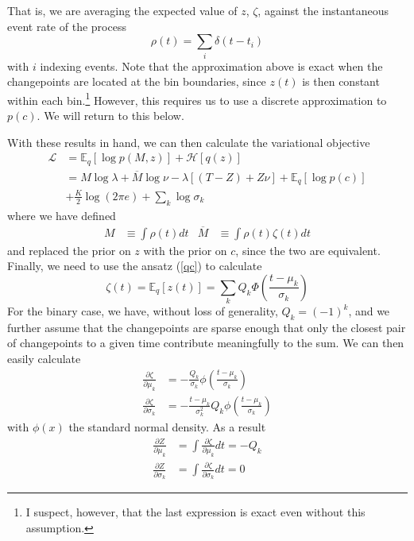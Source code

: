 \documentclass[11pt]{article}
\begin{document}
That is, we are averaging the expected value of $z$, $\zeta$, against the instantaneous event rate of the process
\begin{equation}
    \rho(t) = \sum_i \delta(t - t_i)
\end{equation}
with $i$ indexing events. Note that the approximation above is exact when the changepoints are located at the bin boundaries, since $z(t)$ is then constant within each bin.\footnote{I suspect, however, that the last expression is exact even without this assumption.} However, this requires us to use a discrete approximation to $p(c)$. We will return to this below.

With these results in hand, we can then calculate the variational objective
\begin{align}
    \mathcal{L} &= \mathbb{E}_q [\log p(M, z)] + \mathcal{H}[q(z)] \\
    &= M \log \lambda + \overline{M} \log \nu - \lambda [(T - Z) + Z\nu] + \mathbb{E}_q[\log p(c)] \\
    &+ \frac{K}{2}\log(2\pi e) + \sum_k \log \sigma_k
\end{align}
where we have defined
\begin{align}
    M &\equiv \int \rho(t) dt &
    \overline{M} &\equiv \int \rho(t) \zeta(t) dt
\end{align}
and replaced the prior on $z$ with the prior on $c$, since the two are equivalent. Finally, we need to use the ansatz (\ref{qc}) to calculate
\begin{equation}
    \zeta(t) = \mathbb{E}_q[z(t)] = \sum_k Q_k \Phi\left(\frac{t - \mu_k}{\sigma_k} \right)
\end{equation}
For the binary case, we have, without loss of generality, $Q_k = (-1)^k$, and we further assume that the changepoints are sparse enough that only the closest pair of changepoints to a given time contribute meaningfully to the sum. We can then easily calculate
\begin{align}
    \frac{\partial \zeta}{\partial \mu_k} &= -\frac{Q_k}{\sigma_k}\phi\left( \frac{t - \mu_k}{\sigma_k}\right) \\
    \frac{\partial \zeta}{\partial \sigma_k} &= -\frac{t - \mu_k}{\sigma_k^2} Q_k\phi\left( \frac{t - \mu_k}{\sigma_k}\right)
\end{align}
with $\phi(x)$ the standard normal density. As a result
\begin{align}
    \frac{\partial Z}{\partial \mu_k} &= \int \frac{\partial \zeta}{\partial \mu_k} dt = -Q_k \\
    \frac{\partial Z}{\partial \sigma_k} &= \int \frac{\partial \zeta}{\partial \sigma_k} dt = 0
\end{align}
\end{document}
